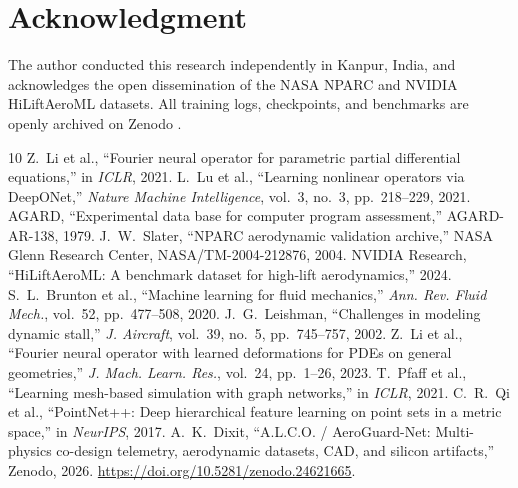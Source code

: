 \documentclass[journal,10pt,twocolumn]{IEEEtran}
\begin{document}
\section*{Acknowledgment}
The author conducted this research independently in Kanpur, India, and acknowledges the open dissemination of the NASA NPARC and NVIDIA HiLiftAeroML datasets. All training logs, checkpoints, and benchmarks are openly archived on Zenodo \cite{dixit2026zenodo}.

\begin{thebibliography}{10}
 Z.~Li et al., ``Fourier neural operator for parametric partial differential equations,'' in \emph{ICLR}, 2021.
 L.~Lu et al., ``Learning nonlinear operators via DeepONet,'' \emph{Nature Machine Intelligence}, vol.~3, no.~3, pp.~218--229, 2021.
 AGARD, ``Experimental data base for computer program assessment,'' AGARD-AR-138, 1979.
 J.~W.~Slater, ``NPARC aerodynamic validation archive,'' NASA Glenn Research Center, NASA/TM-2004-212876, 2004.
 NVIDIA Research, ``HiLiftAeroML: A benchmark dataset for high-lift aerodynamics,'' 2024.
 S.~L.~Brunton et al., ``Machine learning for fluid mechanics,'' \emph{Ann. Rev. Fluid Mech.}, vol.~52, pp.~477--508, 2020.
 J.~G.~Leishman, ``Challenges in modeling dynamic stall,'' \emph{J. Aircraft}, vol.~39, no.~5, pp.~745--757, 2002.
 Z.~Li et al., ``Fourier neural operator with learned deformations for PDEs on general geometries,'' \emph{J. Mach. Learn. Res.}, vol.~24, pp.~1--26, 2023.
 T.~Pfaff et al., ``Learning mesh-based simulation with graph networks,'' in \emph{ICLR}, 2021.
 C.~R.~Qi et al., ``PointNet++: Deep hierarchical feature learning on point sets in a metric space,'' in \emph{NeurIPS}, 2017.
 A.~K.~Dixit, ``A.L.C.O. / AeroGuard-Net: Multi-physics co-design telemetry, aerodynamic datasets, CAD, and silicon artifacts,'' Zenodo, 2026. \url{https://doi.org/10.5281/zenodo.24621665}.
\end{thebibliography}
\end{document}
